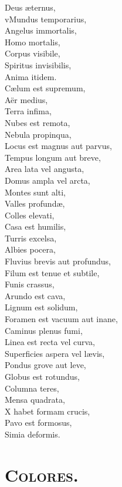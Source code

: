 \documentclass[12pt, twocolumn]{memoir}
\begin{document}
Deus æternus,\\
vMundus temporarius,\\
Angelus immortalis,\\
Homo mortalis,\\
Corpus visibile,\\
Spiritus invisibilis,\\
Anima itidem.\\
Cælum est supremum,\\
Aër medius,\\
Terra infima,\\
Nubes est remota,\\
Nebula propinqua,\\
Locus est magnus aut parvus,\\
Tempus longum aut breve,\\
Area lata vel angusta,\\
Domus ampla vel arcta,\\
Montes sunt alti,\\
Valles profundæ,\\
Colles elevati,\\
Casa est humilis,\\
Turris excelsa,\\
Albies pocera,\\
Fluvius brevis aut profundus,\\
Filum est tenue et subtile,\\
Funis crassus,\\
Arundo est cava,\\
Lignum est solidum,\\
Foramen est vacuum aut inane,\\
Caminus plenus fumi,\\
Linea est recta vel curva,\\
Superficies aspera vel lævis,\\
Pondus grove aut leve,\\
Globus est rotundus,\\
Columna teres,\\
Mensa quadrata,\\
X habet formam crucis,\\
Pavo est formosus,\\
Simia deformis.\\

\section*{\textsc{Colores.}}
\end{document}
